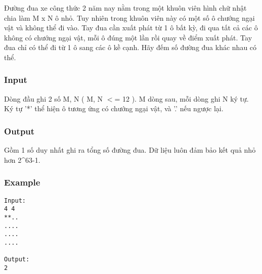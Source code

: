



   Đường đua xe công thức 2 năm nay nằm trong một khuôn viên hình chữ nhật chia làm M x N ô nhỏ. Tuy nhiên trong khuôn viên này có một số ô chướng ngại vật và không thể đi vào. Tay đua cần xuất phát từ 1 ô bất kỳ, đi qua tất cả các ô không có chướng ngại vật, mỗi ô đúng một lần rồi quay về điểm xuất phát. Tay đua chỉ có thể đi từ 1 ô sang các ô kề cạnh. Hãy đếm số đường đua khác nhau có thể.  

\subsubsection{   Input  }

   Dòng đầu ghi 2 số M, N ( M, N $<$= 12 ). M dòng sau, mỗi dòng ghi N ký tự. Ký tự '*' thể hiện ô tương ứng có chướng ngại vật, và '.' nếu ngược lại.  

\subsubsection{   Output  }

   Gồm 1 số duy nhất ghi ra tổng số đường đua. Dữ liệu luôn đảm bảo kết quả nhỏ hơn 2\textasciicircum63-1.  

\subsubsection{   Example  }
\begin{verbatim}
Input:
4 4
**..
....
....
....

Output:
2
\end{verbatim}